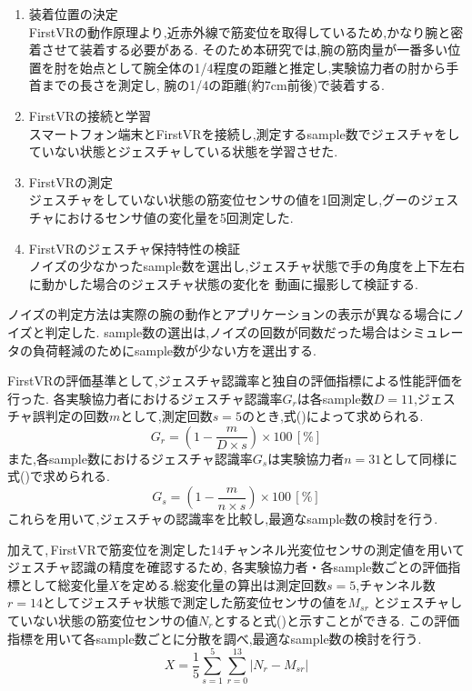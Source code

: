 \documentclass{ltjsreport}
\begin{document}
		\begin{enumerate}
			\item 装着位置の決定\\
				FirstVRの動作原理より,近赤外線で筋変位を取得しているため,かなり腕と密着させて装着する必要がある.
				そのため本研究では,腕の筋肉量が一番多い位置を肘を始点として腕全体の1/4程度の距離と推定し,実験協力者の肘から手首までの長さを測定し,
				腕の1/4の距離(約7cm前後)で装着する.
			\item FirstVRの接続と学習\\
				スマートフォン端末とFirstVRを接続し,測定するsample数でジェスチャをしていない状態とジェスチャしている状態を学習させた.
			\item FirstVRの測定\\
				ジェスチャをしていない状態の筋変位センサの値を1回測定し,グーのジェスチャにおけるセンサ値の変化量を5回測定した.
			\item FirstVRのジェスチャ保持特性の検証\\
				ノイズの少なかったsample数を選出し,ジェスチャ状態で手の角度を上下左右に動かした場合のジェスチャ状態の変化を
				動画に撮影して検証する.
		\end{enumerate}

		ノイズの判定方法は実際の腕の動作とアプリケーションの表示が異なる場合にノイズと判定した.
		sample数の選出は,ノイズの回数が同数だった場合はシミュレータの負荷軽減のためにsample数が少ない方を選出する.

		FirstVRの評価基準として,ジェスチャ認識率と独自の評価指標による性能評価を行った.
		各実験協力者におけるジェスチャ認識率$G_{r}$は各sample数$D = 11$,ジェスチャ誤判定の回数$m$として,測定回数$s = 5$のとき,式()によって求められる.
		\begin{equation}
			\label{eq:gestureprobability1}
			G_{r} = \left( 1-\frac{m}{D \times s} \right) \times 100 \, [\%]
		\end{equation}
		また,各sample数におけるジェスチャ認識率$G_{s}$は実験協力者$n = 31$として同様に式()で求められる.
		\begin{equation}
			\label{eq:gestureprobability2}
			G_{s} = \left( 1-\frac{m}{n \times s} \right) \times 100 \, [\%]
		\end{equation}
		これらを用いて,ジェスチャの認識率を比較し,最適なsample数の検討を行う.
		
		加えて,\,FirstVRで筋変位を測定した14チャンネル光変位センサの測定値を用いてジェスチャ認識の精度を確認するため,
		各実験協力者・各sample数ごとの評価指標として総変化量$X$を定める.総変化量の算出は測定回数$s = 5$,チャンネル数$r = 14$としてジェスチャ状態で測定した筋変位センサの値を$M_{{s}{r}}$
		とジェスチャしていない状態の筋変位センサの値$N_{r}$とすると式()と示すことができる.
		この評価指標を用いて各sample数ごとに分散を調べ,最適なsample数の検討を行う.
		\begin{equation}
			\label{eq:originaldata}
			X = \frac{1}{5} \sum_{s = 1}^{5} \sum_{r = 0}^{13} |N_{r} - M_{{s}{r}}|
		\end{equation}
		
\end{document}
